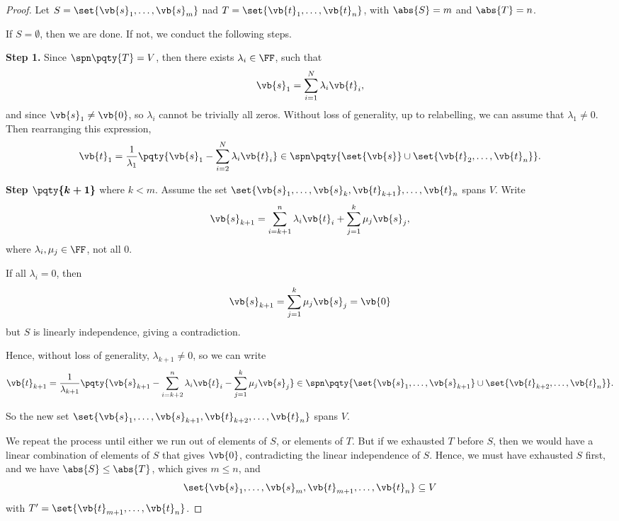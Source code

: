\begin{proof}
    Let \(S = \set{\vb{s}_1, \ldots, \vb{s}_m}\) nad \(T = \set{\vb{t}_1, \ldots, \vb{t}_n}\), with \(\abs{S} = m\) and \(\abs{T} = n\).

    If \(S = \emptyset\), then we are done. If not, we conduct the following steps.

    \textbf{Step 1.} Since \(\spn\pqty{T} = V\), then there exists \(\lambda_i \in \FF\), such that
    \[
        \vb{s}_1 = \sum_{i = 1}^{N} \lambda_i \vb{t}_i,
    \]
    and since \(\vb{s}_1 \neq \vb{0}\), so \(\lambda_i\) cannot be trivially all zeros. Without loss of generality, up to relabelling, we can assume that \(\lambda_1 \neq 0\). Then rearranging this expression,
    \[
        \vb{t}_1 = \frac{1}{\lambda_1} \pqty{\vb{s}_1 - \sum_{i = 2}^{N} \lambda_i \vb{t}_i} \in \spn\pqty{\set{\vb{s}} \cup \set{\vb{t}_2, \ldots, \vb{t}_n}}.
    \]

    \textbf{Step \(\boldsymbol{\pqty{k + 1}}\)} where \(k < m\). Assume the set \(\set{\vb{s}_1, \ldots, \vb{s}_k, \vb{t}_{k + 1}}, \ldots, \vb{t}_n\) spans \(V\). Write
    \[
        \vb{s}_{k + 1} = \sum_{i = k + 1}^{n} \lambda_i \vb{t}_i + \sum_{j = 1}^{k} \mu_j \vb{s}_j,
    \]
    where \(\lambda_i, \mu_j \in \FF\), not all \(0\).

    If all \(\lambda_i = 0\), then
    \[
        \vb{s}_{k + 1} = \sum_{j = 1}^{k} \mu_j \vb{s}_j = \vb{0}
    \]
    but \(S\) is linearly independence, giving a contradiction.

    Hence, without loss of generality, \(\lambda_{k + 1} \neq 0\), so we can write
    \[
        \vb{t}_{k + 1} = \frac{1}{\lambda_{k + 1}} \pqty{\vb{s}_{k + 1} - \sum_{i = k + 2}^{n} \lambda_i \vb{t}_i - \sum_{j = 1}^{k} \mu_j \vb{s}_j} \in \spn\pqty{\set{\vb{s}_1, \ldots, \vb{s}_{k + 1}} \cup \set{\vb{t}_{k + 2}, \ldots, \vb{t}_n}}.
    \]

    So the new set \(\set{\vb{s}_1, \ldots, \vb{s}_{k + 1}, \vb{t}_{k + 2}, \ldots, \vb{t}_n}\) spans \(V\).

    We repeat the process until either we run out of elements of \(S\), or elements of \(T\). But if we exhausted \(T\) before \(S\), then we would have a linear combination of elements of \(S\) that gives \(\vb{0}\), contradicting the linear independence of \(S\). Hence, we must have exhausted \(S\) first, and we have \(\abs{S} \leq \abs{T}\), which gives \(m \leq n\), and
    \[
        \set{\vb{s}_1, \ldots, \vb{s}_m, \vb{t}_{m + 1}, \ldots, \vb{t}_n} \subseteq V
    \]
    with \(T' = \set{\vb{t}_{m + 1}, \ldots, \vb{t}_n}\).
\end{proof}


